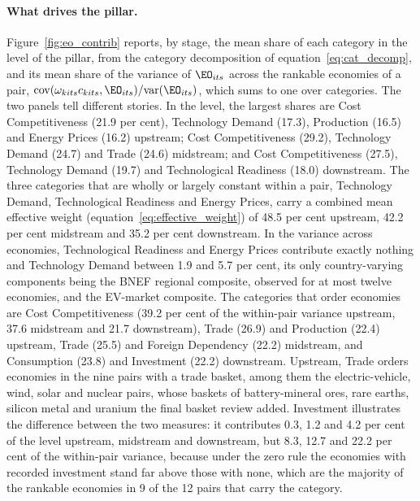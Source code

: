 \paragraph{What drives the pillar.} Figure~\ref{fig:eo_contrib} reports, by stage, the mean share
of each category in the level of the pillar, from the category decomposition of
equation~\eqref{eq:cat_decomp}, and its mean share of the variance of $\EO_{its}$ across the
rankable economies of a pair, $\mathrm{cov}(\omega_{kits}c_{kits},\EO_{its})/\mathrm{var}(\EO_{its})$,
which sums to one over categories. The two panels tell different stories. In the level, the
largest shares are Cost Competitiveness (21.9 per cent), Technology Demand (17.3), Production
(16.5) and Energy Prices (16.2) upstream; Cost Competitiveness (29.2), Technology Demand (24.7) and
Trade (24.6) midstream; and Cost Competitiveness (27.5), Technology Demand (19.7) and Technological
Readiness (18.0) downstream. The three categories that are wholly or largely constant within a
pair, Technology Demand, Technological Readiness and Energy Prices, carry a combined mean effective
weight (equation~\eqref{eq:effective_weight}) of 48.5 per cent upstream, 42.2 per cent midstream
and 35.2 per cent downstream. In the variance across economies, Technological Readiness and Energy
Prices contribute exactly nothing and Technology Demand between 1.9 and 5.7 per cent, its only
country-varying components being the BNEF regional composite, observed for at most twelve
economies, and the EV-market composite. The categories that order economies are Cost
Competitiveness (39.2 per cent of the within-pair variance upstream, 37.6 midstream and 21.7
downstream), Trade (26.9) and Production (22.4) upstream, Trade (25.5) and Foreign Dependency
(22.2) midstream, and Consumption (23.8) and Investment (22.2) downstream. Upstream, Trade
orders economies in the nine pairs with a trade basket, among them the electric-vehicle, wind,
solar and nuclear pairs, whose baskets of battery-mineral ores, rare earths, silicon metal and
uranium the final basket review added. Investment illustrates the difference between the two
measures: it contributes 0.3, 1.2 and 4.2 per cent of the level upstream, midstream and
downstream, but 8.3, 12.7 and 22.2 per cent of the within-pair variance, because under the zero
rule the economies with recorded investment stand far above those with none, which are the
majority of the rankable economies in 9 of the 12 pairs that carry the category.



